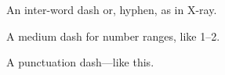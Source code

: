 An inter-word dash or, hyphen, as in X-ray.

A medium dash for number ranges, like 1--2.

A punctuation dash---like this.
